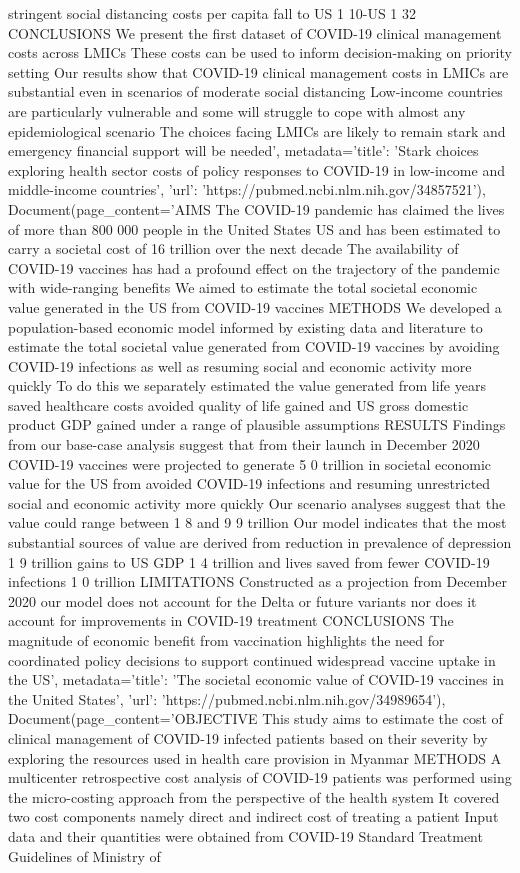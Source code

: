 stringent social distancing costs per capita fall to US 1 10-US 1 32 CONCLUSIONS We present the first dataset of COVID-19 clinical management costs across LMICs These costs can be used to inform decision-making on priority setting Our results show that COVID-19 clinical management costs in LMICs are substantial even in scenarios of moderate social distancing Low-income countries are particularly vulnerable and some will struggle to cope with almost any epidemiological scenario The choices facing LMICs are likely to remain stark and emergency financial support will be needed', metadata={'title': 'Stark choices exploring health sector costs of policy responses to COVID-19 in low-income and middle-income countries', 'url': 'https://pubmed.ncbi.nlm.nih.gov/34857521'}), Document(page\_content='AIMS The COVID-19 pandemic has claimed the lives of more than 800 000 people in the United States US and has been estimated to carry a societal cost of 16 trillion over the next decade The availability of COVID-19 vaccines has had a profound effect on the trajectory of the pandemic with wide-ranging benefits We aimed to estimate the total societal economic value generated in the US from COVID-19 vaccines METHODS We developed a population-based economic model informed by existing data and literature to estimate the total societal value generated from COVID-19 vaccines by avoiding COVID-19 infections as well as resuming social and economic activity more quickly To do this we separately estimated the value generated from life years saved healthcare costs avoided quality of life gained and US gross domestic product GDP gained under a range of plausible assumptions RESULTS Findings from our base-case analysis suggest that from their launch in December 2020 COVID-19 vaccines were projected to generate 5 0 trillion in societal economic value for the US from avoided COVID-19 infections and resuming unrestricted social and economic activity more quickly Our scenario analyses suggest that the value could range between 1 8 and 9 9 trillion Our model indicates that the most substantial sources of value are derived from reduction in prevalence of depression 1 9 trillion gains to US GDP 1 4 trillion and lives saved from fewer COVID-19 infections 1 0 trillion LIMITATIONS Constructed as a projection from December 2020 our model does not account for the Delta or future variants nor does it account for improvements in COVID-19 treatment CONCLUSIONS The magnitude of economic benefit from vaccination highlights the need for coordinated policy decisions to support continued widespread vaccine uptake in the US', metadata={'title': 'The societal economic value of COVID-19 vaccines in the United States', 'url': 'https://pubmed.ncbi.nlm.nih.gov/34989654'}), Document(page\_content='OBJECTIVE This study aims to estimate the cost of clinical management of COVID-19 infected patients based on their severity by exploring the resources used in health care provision in Myanmar METHODS A multicenter retrospective cost analysis of COVID-19 patients was performed using the micro-costing approach from the perspective of the health system It covered two cost components namely direct and indirect cost of treating a patient Input data and their quantities were obtained from COVID-19 Standard Treatment Guidelines of Ministry of 